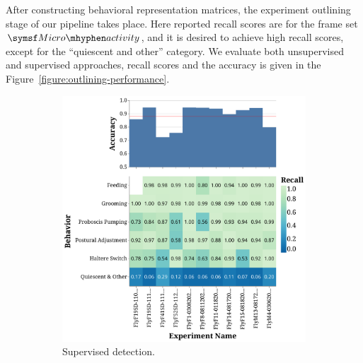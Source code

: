 After constructing behavioral representation matrices, the experiment outlining stage of our pipeline takes place.
Here reported recall scores are for the frame set $\MicroActivity$, and it is desired to achieve high recall scores, except for the ``quiescent and other'' category.
We evaluate both unsupervised and supervised approaches, recall scores and the accuracy is given in the Figure~\ref{figure:outlining-performance}.

\begin{figure}[htb!]
	\centering
	\begin{subfigure}[b]{0.495\linewidth}
		\centering\includegraphics[width=\linewidth]{figures/OutliningPerformance-Supervised.pdf}
		\caption{Supervised detection.}
	\end{subfigure}%
	\hfill
	\begin{subfigure}[b]{0.495\linewidth}

\end{subfigure}
\end{figure}
